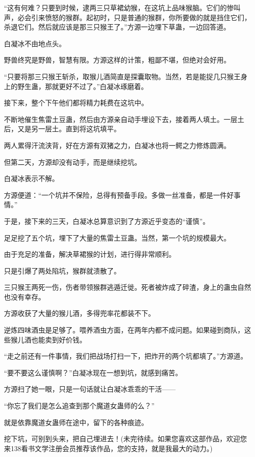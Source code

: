 \begin{this_body}
“这有何难？只要到时候，逮两三只草裙幼猴，在这坑上品味猴脑。它们的惨叫声，必会引来愤怒的猴群。起初时，只是普通的猴群，你所要做的就是挡住它们，杀退它们。然后就应该是那三只猴王了。”方源一边埋下草蛊，一边回答道。

白凝冰不由地点头。

野兽终究是野兽，智慧有限。方源这样的计策，粗鄙不堪，但绝对会好用。

“只要将那三只猴王斩杀，取猴儿酒简直是探囊取物。当然，若是能捉几只猴王身上的野生蛊，那就更好不过了。”白凝冰琢磨着。

接下来，整个下午他们都将精力耗费在这坑中。

不断地催生焦雷土豆蛊，然后由方源亲自动手埋设下去，接着两人填土。一层土后，又是另一层土。直到将这坑填平。

两人累得汗流浃背，好在方源有双猪之力，白凝冰也将一鳄之力修炼圆满。

但第二天，方源却没有动手，而是继续挖坑。

白凝冰表示不解。

方源便道：“一个坑并不保险，总得有预备手段。多做一丝准备，都是一件好事情。”

于是，接下来的三天，白凝冰总算意识到了方源近乎变态的“谨慎”。

足足挖了五个坑，埋下了大量的焦雷土豆蛊。当然，第一个坑的规模最大。

由于充足的准备，解决草裙猴的计划，进行得非常顺利。

只是引爆了两处陷坑，猴群就溃散了。

三只猴王两死一伤，伤者带领猴群逃遁迁徙。死者被炸成了碎渣，身上的蛊虫自然也没有幸存。

方源收获了大量的猴儿酒，多得兜率花都装不下。

逆炼四味酒虫是足够了。喂养酒虫方面，在两年内都不成问题。如果碰到商队，这些猴儿酒也能卖到好价钱。

“走之前还有一件事情，我们把战场打扫一下，把炸开的两个坑都填了。”方源道。

“要不要这么谨慎啊？”白凝冰现在一想到坑，就感到痛苦。

方源扫了她一眼，只是一句话就让白凝冰乖乖的干活——

“你忘了我们是怎么追查到那个魔道女蛊师的么？”

就是依靠魔道女蛊师在途中，留下的各种痕迹。

挖下坑，可别到头来，把自己埋进去！(未完待续。如果您喜欢这部作品，欢迎您来138看书文学注册会员推荐该作品，您的支持，就是我最大的动力。)

\end{this_body}

